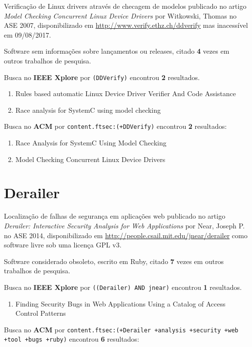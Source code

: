 Verificação de Linux drivers através de checagem de modelos
publicado no artigo {\it Model Checking Concurrent Linux Device Drivers}
por Witkowski, Thomas
no ASE 2007,
disponibilizado em \url{http://www.verify.ethz.ch/ddverify}
mas inacessível em 09/08/2017.

Software sem informações sobre lançamentos ou releases,
citado {\bf 4} vezes em outros trabalhos de pesquisa.

Busca no {\bf IEEE Xplore} por
\texttt{(DDVerify)}
encontrou {\bf 2}
resultados.

\begin{enumerate}
\item Rules based automatic Linux Device Driver Verifier And Code Assistance
\item Race analysis for SystemC using model checking
\end{enumerate}

Busca no {\bf ACM} por
\texttt{content.ftsec:(+DDVerify)}
encontrou {\bf 2}
resultados:

\begin{enumerate}
\item Race Analysis for SystemC Using Model Checking
\item Model Checking Concurrent Linux Device Drivers
\end{enumerate}

\section{Derailer}

Localização de falhas de segurança em aplicações web
publicado no artigo {\it Derailer: Interactive Security Analysis for Web Applications}
por Near, Joseph P.
no ASE 2014,
disponibilizado em \url{http://people.csail.mit.edu/jnear/derailer}
como software livre
sob uma licença GPL v3.

Software considerado obsoleto,
escrito em Ruby,
citado {\bf 7} vezes em outros trabalhos de pesquisa.

Busca no {\bf IEEE Xplore} por
\texttt{((Derailer) AND jnear)}
encontrou {\bf 1}
resultados.

\begin{enumerate}
\item Finding Security Bugs in Web Applications Using a Catalog of Access Control Patterns
\end{enumerate}

Busca no {\bf ACM} por
\texttt{content.ftsec:(+Derailer +analysis +security +web +tool +bugs +ruby)}
encontrou {\bf 6}
resultados:

